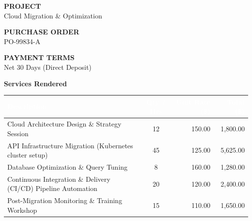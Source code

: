 \documentclass[10pt]{article}
\begin{document}
\vspace{0.4cm}

\begin{tcolorbox}[
    colback=lightbg,
    colframe=secondary,
    arc=4pt,
    boxrule=1.5pt,
    left=12pt, right=12pt, top=8pt, bottom=8pt
]
    \begin{minipage}[t]{0.3\textwidth}
        \textcolor{mutedtext}{\footnotesize\bfseries PROJECT} \\
        {\small Cloud Migration \& Optimization}
    \end{minipage}%
    \begin{minipage}[t]{0.3\textwidth}
        \textcolor{mutedtext}{\footnotesize\bfseries PURCHASE ORDER} \\
        {\small PO-99834-A}
    \end{minipage}%
    \begin{minipage}[t]{0.4\textwidth}
        \raggedleft
        \textcolor{mutedtext}{\footnotesize\bfseries PAYMENT TERMS} \\
        {\small Net 30 Days (Direct Deposit)}
    \end{minipage}
\end{tcolorbox}

\vspace{0.4cm}

{\color{primary}\large\bfseries Services Rendered}
\vspace{0.2cm}

\begin{tabularx}{\textwidth}{L C R R}
    \textcolor{white}{\textbf{Description}} & 
    \textcolor{white}{\textbf{Qty / Hrs}} & 
    \textcolor{white}{\textbf{Unit Rate (\$)} } & 
    \textcolor{white}{\textbf{Total (\$)} } \\
    \midrule
    Cloud Architecture Design \& Strategy Session & 12 & 150.00 & 1,800.00 \\
    API Infrastructure Migration (Kubernetes cluster setup) & 45 & 125.00 & 5,625.00 \\
    Database Optimization \& Query Tuning & 8 & 160.00 & 1,280.00 \\
    Continuous Integration \& Delivery (CI/CD) Pipeline Automation & 20 & 120.00 & 2,400.00 \\
    Post-Migration Monitoring \& Training Workshop & 15 & 110.00 & 1,650.00 \\
    \bottomrule
\end{tabularx}
\end{document}
